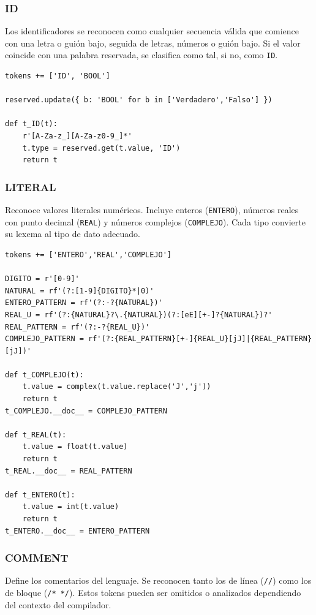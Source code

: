 \documentclass{article}
\begin{document}
\subsubsection{ID}

Los identificadores se reconocen como cualquier secuencia válida que comience con una letra o guión bajo, seguida de letras, números o guión bajo. Si el valor coincide con una palabra reservada, se clasifica como tal, si no, como \texttt{ID}.

\begin{lstlisting}[style=mypython]
tokens += ['ID', 'BOOL']

reserved.update({ b: 'BOOL' for b in ['Verdadero','Falso'] })

def t_ID(t):
    r'[A-Za-z_][A-Za-z0-9_]*'
    t.type = reserved.get(t.value, 'ID')
    return t
\end{lstlisting}

\subsubsection{LITERAL}

Reconoce valores literales numéricos. Incluye enteros (\texttt{ENTERO}), números reales con punto decimal (\texttt{REAL}) y números complejos (\texttt{COMPLEJO}). Cada tipo convierte su lexema al tipo de dato adecuado.

\begin{lstlisting}[style=mypython]
tokens += ['ENTERO','REAL','COMPLEJO']

DIGITO = r'[0-9]'
NATURAL = rf'(?:[1-9]{DIGITO}*|0)'
ENTERO_PATTERN = rf'(?:-?{NATURAL})'
REAL_U = rf'(?:{NATURAL}?\.{NATURAL})(?:[eE][+-]?{NATURAL})?'
REAL_PATTERN = rf'(?:-?{REAL_U})'
COMPLEJO_PATTERN = rf'(?:{REAL_PATTERN}[+-]{REAL_U}[jJ]|{REAL_PATTERN}[jJ])'

def t_COMPLEJO(t):
    t.value = complex(t.value.replace('J','j'))
    return t
t_COMPLEJO.__doc__ = COMPLEJO_PATTERN

def t_REAL(t):
    t.value = float(t.value)
    return t
t_REAL.__doc__ = REAL_PATTERN

def t_ENTERO(t):
    t.value = int(t.value)
    return t
t_ENTERO.__doc__ = ENTERO_PATTERN
\end{lstlisting}

\subsubsection{COMMENT}
Define los comentarios del lenguaje. Se reconocen tanto los de línea (\texttt{//}) como los de bloque (\texttt{/* */}). Estos tokens pueden ser omitidos o analizados dependiendo del contexto del compilador.
\end{document}
